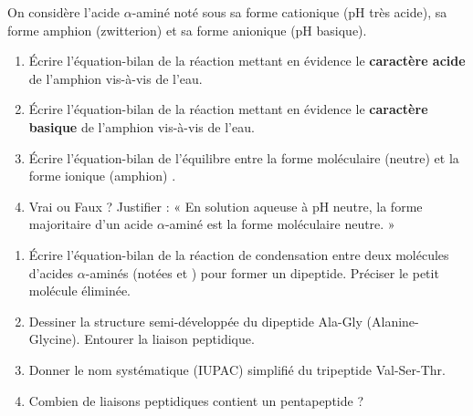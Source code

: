 \documentclass[11pt]{article}
\begin{document}
\begin{exercice}
On considère l'acide $\alpha$-aminé noté  sous sa forme cationique (pH très acide),  sa forme amphion (zwitterion) et  sa forme anionique (pH basique).
\begin{enumerate}
    \item Écrire l'équation-bilan de la réaction mettant en évidence le \textbf{caractère acide} de l'amphion  vis-à-vis de l'eau.
    \item Écrire l'équation-bilan de la réaction mettant en évidence le \textbf{caractère basique} de l'amphion  vis-à-vis de l'eau.
    \item Écrire l'équation-bilan de l'équilibre entre la forme moléculaire (neutre)  et la forme ionique (amphion) .
    \item Vrai ou Faux ? Justifier : « En solution aqueuse à pH neutre, la forme majoritaire d'un acide $\alpha$-aminé est la forme moléculaire neutre. »
\end{enumerate}
\end{exercice}

\begin{exercice}
\begin{enumerate}
    \item Écrire l'équation-bilan de la réaction de condensation entre deux molécules d'acides $\alpha$-aminés (notées  et ) pour former un dipeptide. Préciser le petit molécule éliminée.
    \item Dessiner la structure semi-développée du dipeptide Ala-Gly (Alanine-Glycine). Entourer la liaison peptidique.
    \item Donner le nom systématique (IUPAC) simplifié du tripeptide Val-Ser-Thr.
    \item Combien de liaisons peptidiques contient un pentapeptide ?
\end{enumerate}
\end{exercice}
\end{document}
